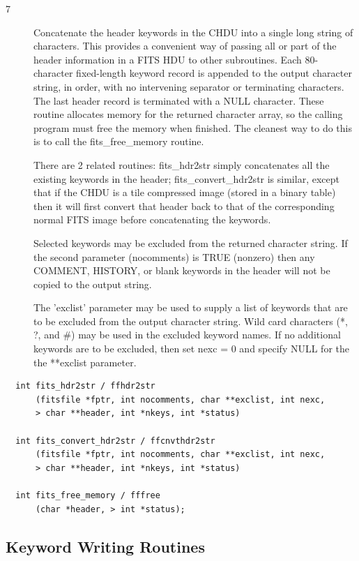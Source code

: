 \documentclass[11pt]{book}
\begin{document}
\begin{description}
\item[7 ] Concatenate the header keywords in the CHDU into a single long
    string of characters.  This provides a convenient way of passing
    all or part of the header information in a FITS HDU to other subroutines.
    Each 80-character fixed-length keyword record is appended to the
    output character string, in order, with no intervening separator or
    terminating characters. The last header record is terminated with
    a NULL character.  These routine allocates memory for the returned
    character array, so the calling program must free the memory when
    finished.  The cleanest way to do this is to
    call the fits\_free\_memory routine.

    There are 2 related routines: fits\_hdr2str simply concatenates all
    the existing keywords in the header; fits\_convert\_hdr2str is similar,
    except that if the CHDU is a tile compressed image (stored in a binary
    table) then it will first convert that header back to that of the corresponding
    normal FITS image before concatenating the keywords.

    Selected keywords may be excluded from the returned character string.
    If the second parameter (nocomments) is TRUE (nonzero) then any
    COMMENT, HISTORY, or blank keywords in the header will not be copied
    to the output string.

    The 'exclist' parameter may be used to supply a list of keywords
    that are to be excluded from the output character string. Wild card
    characters (*, ?, and \#) may be used in the excluded keyword names.
    If no additional keywords are to be excluded, then set nexc = 0 and
   specify NULL for the the **exclist  parameter.  \label{ffhdr2str}
\end{description}

\begin{verbatim}
  int fits_hdr2str / ffhdr2str
      (fitsfile *fptr, int nocomments, char **exclist, int nexc,
      > char **header, int *nkeys, int *status)

  int fits_convert_hdr2str / ffcnvthdr2str
      (fitsfile *fptr, int nocomments, char **exclist, int nexc,
      > char **header, int *nkeys, int *status)

  int fits_free_memory / fffree
      (char *header, > int *status);

\end{verbatim}


\subsection{Keyword Writing Routines}
\end{document}

